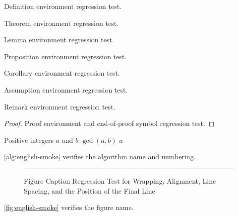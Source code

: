 \documentclass[english,tocdepth3]{uestcthesis}
\begin{document}
\begin{definition}Definition environment regression test.\end{definition}
\begin{theorem}Theorem environment regression test.\end{theorem}
\begin{lemma}Lemma environment regression test.\end{lemma}
\begin{proposition}Proposition environment regression test.\end{proposition}
\begin{corollary}Corollary environment regression test.\end{corollary}
\begin{assumption}Assumption environment regression test.\end{assumption}
\begin{remark}Remark environment regression test.\end{remark}
\begin{proof}Proof environment and end-of-proof symbol regression test.\end{proof}

\begin{algorithm}[htbp]
    \caption{Algorithm Environment Regression Test}
    \label{alg:english-smoke}
    \begin{algorithmic}[1]
        \Require Positive integers $a$ and $b$
        \Ensure $\gcd(a,b)$
        \State \Return $a$
    \end{algorithmic}
\end{algorithm}
\autoref{alg:english-smoke} verifies the algorithm name and numbering.

\begin{figure}[htbp]
    \centering
    \rule{8cm}{3cm}
    \caption{Figure Caption Regression Test for Wrapping, Alignment, Line Spacing, and the Position of the Final Line}
    \label{fig:english-smoke}
\end{figure}

\autoref{fig:english-smoke} verifies the figure name.

\clearpage
\end{document}
